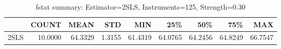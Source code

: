 \begin{table}[ht]
\centering
\caption{fstat summary: Estimator=2SLS, Instruments=125, Strength=0.30}
\begin{tabular}{lrrrrrrrr}
\toprule
 & COUNT & MEAN & STD & MIN & 25\% & 50\% & 75\% & MAX \\
\midrule
2SLS & 10.0000 & 64.3329 & 1.3155 & 61.4319 & 64.0765 & 64.2456 & 64.8249 & 66.7547 \\
\bottomrule
\end{tabular}
\end{table}
